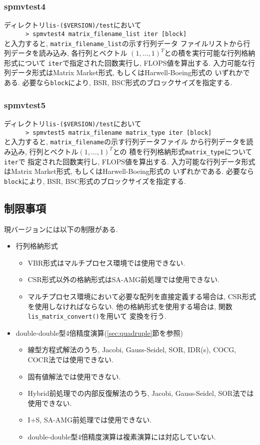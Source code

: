 \documentclass[a4paper]{jarticle}
\begin{document}
{{\subsubsection{spmvtest4}
ディレクトリ{\tt lis-(\$VERSION)/test}において\\
 \verb+      > spmvtest4 matrix_filename_list iter [block]+\\
と入力すると, {\tt matrix\_filename\_list}の示す行列データ
ファイルリストから行列データを読み込み, 各行列とベクトル
$(1,\dots,1)^T$との積を実行可能な行列格納形式について
{\tt iter}で指定された回数実行し, FLOPS値を算出する.
入力可能な行列データ形式はMatrix Market形式, もしくはHarwell-Boeing形式の
いずれかである. 
必要なら{\tt block}により, BSR, BSC形式のブロックサイズを指定する. 

\subsubsection{spmvtest5}
ディレクトリ{\tt lis-(\$VERSION)/test}において\\
 \verb+      > spmvtest5 matrix_filename matrix_type iter [block]+\\
と入力すると, {\tt matrix\_filename}の示す行列データファイル
から行列データを読み込み, 行列とベクトル$(1,\dots,1)^T$との
積を行列格納形式{\tt matrix\_type}について{\tt iter}で
指定された回数実行し, FLOPS値を算出する. 
入力可能な行列データ形式はMatrix Market形式, もしくはHarwell-Boeing形式の
いずれかである. 
必要なら{\tt block}により, BSR, BSC形式のブロックサイズを指定する. 

\subsection{制限事項}
現バージョンには以下の制限がある. 
\begin{itemize}
\item 行列格納形式
\begin{itemize}
\item VBR形式はマルチプロセス環境では使用できない. 
\item CSR形式以外の格納形式はSA-AMG前処理では使用できない. 
\item マルチプロセス環境において必要な配列を直接定義する場合は, CSR形式
      を使用しなければならない.
      他の格納形式を使用する場合は, 関数\verb|lis_matrix_convert()|を用いて
      変換を行う. 
\end{itemize}

\item double-double型4倍精度演算(\ref{sec:quadruple}節を参照)
\begin{itemize}
\item 線型方程式解法のうち, Jacobi, Gauss-Seidel, SOR, IDR(s), COCG, COCR法では使用できない.
\item 固有値解法では使用できない.
\item Hybrid前処理での内部反復解法のうち, Jacobi, Gauss-Seidel, SOR法では使用できない.
\item I+S, SA-AMG前処理では使用できない.
\item double-double型4倍精度演算は複素演算には対応していない.
\end{itemize}


\end{itemize}}}
\end{document}
